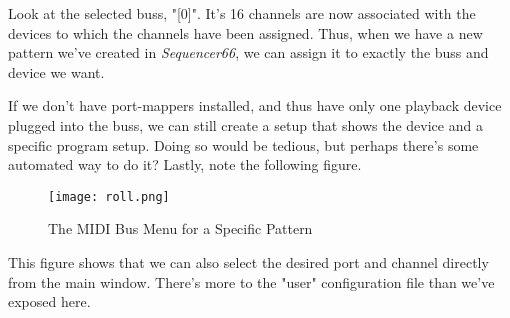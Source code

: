    Look at the selected buss, "[0]".  It's 16 channels are now associated with
   the devices to which the channels have been assigned.
   Thus, when we have a new pattern we've created in \textsl{Sequencer66},
   we can assign it to exactly the buss and device we want.

   If we don't have port-mappers installed, and thus have only one playback
   device plugged into the buss, we can still create a setup that
   shows the device and a specific program setup.  Doing so would be tedious,
   but perhaps there's some automated way to do it?
   Lastly, note the following figure.

\begin{figure}[H]
   \centering 
   \texttt{[image: roll.png]}
   \caption{The MIDI Bus Menu for a Specific Pattern}
   \label{fig:seq66_manual_0_userfile_seq_buss_dropdown}
\end{figure}

   This figure shows that we can also select the desired port and channel
   directly from the main window.
   There's more to the "user" configuration file than we've exposed here.


